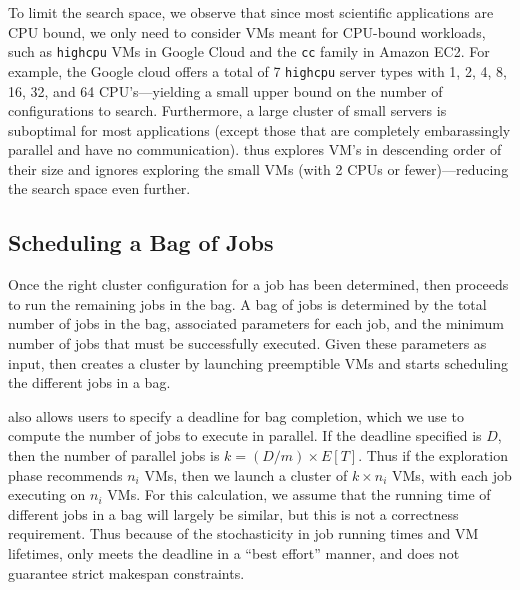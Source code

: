 
To limit the search space, we observe that since most scientific applications are CPU bound, we only need to consider VMs meant for CPU-bound workloads, such as \texttt{highcpu} VMs in Google Cloud and the \texttt{cc} family in Amazon EC2.
For example, the Google cloud offers a total of 7 \texttt{highcpu} server types with 1, 2, 4, 8, 16, 32, and 64 CPU's---yielding a small upper bound on the number of configurations to search. 
Furthermore, a large cluster of small servers is suboptimal for most applications (except those that are completely embarassingly parallel and have no communication).
\sysname thus explores VM's in descending order of their size and ignores exploring the small VMs (with 2 CPUs or fewer)---reducing the search space even further. 



\subsection{Scheduling a Bag of Jobs}


Once the right cluster configuration for a job has been determined, \sysname then proceeds to run the remaining jobs in the bag.
A bag of jobs is determined by the total number of jobs in the bag, associated parameters for each job, and the minimum number of jobs that must be successfully executed.  
Given these parameters as input, \sysname then creates a cluster by launching preemptible VMs and starts scheduling the different jobs in a bag.

\sysname also allows users to specify a deadline for bag completion, which we use to compute the number of jobs to execute in parallel. If the deadline specified is $D$, then the number of parallel jobs is $k=(D/m)\times E[T]$. Thus if the exploration phase recommends $n_i$ VMs, then we launch a cluster of $k\times n_i$ VMs, with each job executing on $n_i$ VMs. 
For this calculation, we assume that the running time of different jobs in a bag will largely be similar, but this is not a correctness requirement.
Thus because of the stochasticity in job running times and VM lifetimes, \sysname only meets the deadline in a ``best effort'' manner, and does not guarantee strict makespan constraints. 

